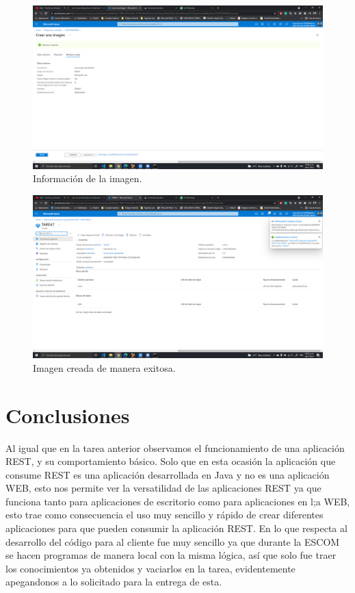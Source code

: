 \documentclass[11pt]{article}
\begin{document}
		\begin{figure}[H]
			\centering
			\includegraphics[scale=0.34]{resources/revisarycreaimg.png}
			\caption{Información de la imagen.}\label{fig:picture}
		\end{figure}
		\begin{figure}[H]
			\centering
			\includegraphics[scale=0.34]{resources/imagenok.png}
			\caption{Imagen creada de manera exitosa.}\label{fig:picture}
		\end{figure}
		
		\section{Conclusiones}
	Al igual que en la tarea anterior observamos el funcionamiento de una aplicación REST, y su comportamiento básico. Solo que en esta ocasión la aplicación que consume REST es una aplicación desarrollada en Java y no es una aplicación WEB, esto nos permite ver la versatilidad de las aplicaciones REST ya que funciona tanto para aplicaciones de escritorio como para aplicaciones en l;a WEB, esto trae como consecuencia el uso muy sencillo y rápido de crear diferentes aplicaciones para que pueden consumir la aplicación REST. En lo que respecta al desarrollo del código para al cliente fue muy sencillo ya que durante la ESCOM se hacen programas de manera local con la misma lógica, así que solo fue traer los conocimientos ya obtenidos y vaciarlos en la tarea, evidentemente apegandonos a lo solicitado para la entrega de esta. 
\end{document}
